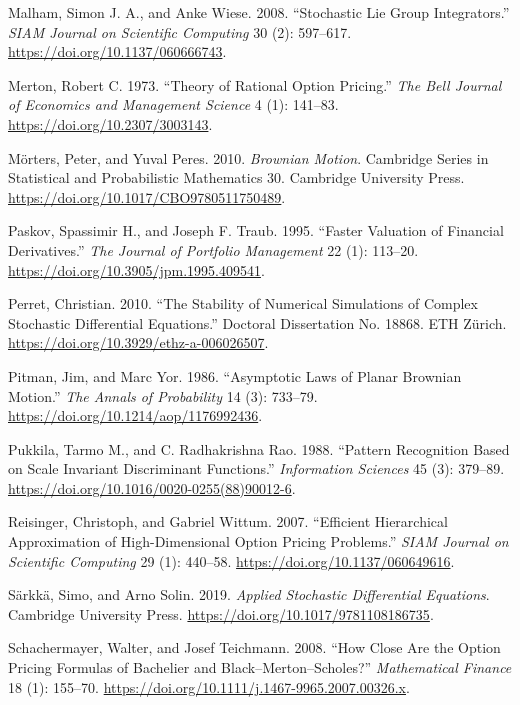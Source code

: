 \documentclass[
  english,
  10pt,
  letterpaper,
  DIV=11,
  numbers=noendperiod]{scrartcl}
\newlength{\cslhangindent}
\newenvironment{CSLReferences}[2] %
 {\begin{list}{}{%
  \setlength{\itemindent}{0pt}
  \setlength{\leftmargin}{0pt}
  \setlength{\parsep}{0pt}
  \ifodd #1
   \setlength{\leftmargin}{\cslhangindent}
   \setlength{\itemindent}{-1\cslhangindent}
  \fi
  \setlength{\itemsep}{#2\baselineskip}}}
 {\end{list}}
\theoremstyle{definition}
\theoremstyle{plain}
\theoremstyle{plain}
\theoremstyle{remark}
\begin{document}
\begin{CSLReferences}{1}{1}
Malham, Simon J. A., and Anke Wiese. 2008. {``Stochastic Lie Group
Integrators.''} \emph{SIAM Journal on Scientific Computing} 30 (2):
597--617. \url{https://doi.org/10.1137/060666743}.

Merton, Robert C. 1973. {``Theory of Rational Option Pricing.''}
\emph{The Bell Journal of Economics and Management Science} 4 (1):
141--83. \url{https://doi.org/10.2307/3003143}.

Mörters, Peter, and Yuval Peres. 2010. \emph{Brownian Motion}. Cambridge
Series in Statistical and Probabilistic Mathematics 30. Cambridge
University Press. \url{https://doi.org/10.1017/CBO9780511750489}.

Paskov, Spassimir H., and Joseph F. Traub. 1995. {``Faster Valuation of
Financial Derivatives.''} \emph{The Journal of Portfolio Management} 22
(1): 113--20. \url{https://doi.org/10.3905/jpm.1995.409541}.

Perret, Christian. 2010. {``The Stability of Numerical Simulations of
Complex Stochastic Differential Equations.''} Doctoral Dissertation No.
18868. ETH Z{ü}rich. \url{https://doi.org/10.3929/ethz-a-006026507}.

Pitman, Jim, and Marc Yor. 1986. {``Asymptotic Laws of Planar Brownian
Motion.''} \emph{The Annals of Probability} 14 (3): 733--79.
\url{https://doi.org/10.1214/aop/1176992436}.

Pukkila, Tarmo M., and C. Radhakrishna Rao. 1988. {``Pattern Recognition
Based on Scale Invariant Discriminant Functions.''} \emph{Information
Sciences} 45 (3): 379--89.
\url{https://doi.org/10.1016/0020-0255(88)90012-6}.

Reisinger, Christoph, and Gabriel Wittum. 2007. {``Efficient
Hierarchical Approximation of High-Dimensional Option Pricing
Problems.''} \emph{SIAM Journal on Scientific Computing} 29 (1):
440--58. \url{https://doi.org/10.1137/060649616}.

Särkkä, Simo, and Arno Solin. 2019. \emph{Applied Stochastic
Differential Equations}. Cambridge University Press.
\url{https://doi.org/10.1017/9781108186735}.

Schachermayer, Walter, and Josef Teichmann. 2008. {``How Close Are the
Option Pricing Formulas of Bachelier and Black--Merton--Scholes?''}
\emph{Mathematical Finance} 18 (1): 155--70.
\url{https://doi.org/10.1111/j.1467-9965.2007.00326.x}.


\end{CSLReferences}
\end{document}
